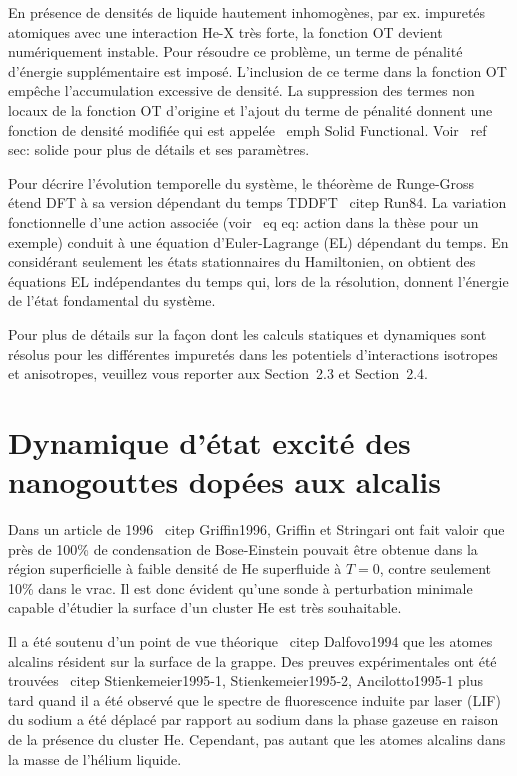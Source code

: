 		En présence de densités de liquide hautement inhomogènes, par ex. impuretés atomiques avec une interaction He-X très forte, la fonction OT devient numériquement instable. Pour résoudre ce problème, un terme de pénalité d'énergie supplémentaire est imposé. L'inclusion de ce terme dans la fonction OT empêche l'accumulation excessive de densité. La suppression des termes non locaux de la fonction OT d'origine et l'ajout du terme de pénalité donnent une fonction de densité modifiée qui est appelée \ emph {Solid Functional}. Voir \ ref {sec: solide} pour plus de détails et ses paramètres.
		
		Pour décrire l'évolution temporelle du système, le théorème de Runge-Gross étend DFT à sa version dépendant du temps TDDFT \ citep {Run84}. La variation fonctionnelle d'une action associée (voir \ eq {eq: action dans la thèse} pour un exemple) conduit à une équation d'Euler-Lagrange (EL) dépendant du temps. En considérant seulement les états stationnaires du Hamiltonien, on obtient des équations EL indépendantes du temps qui, lors de la résolution, donnent l'énergie de l'état fondamental du système.
		
		Pour plus de détails sur la façon dont les calculs statiques et dynamiques sont résolus pour les différentes impuretés dans les potentiels d'interactions isotropes et anisotropes, veuillez vous reporter aux Section~2.3 et Section~2.4.
		
	\section*{Dynamique d'état excité des nanogouttes dopées aux alcalis}
		Dans un article de 1996 \ citep {Griffin1996}, Griffin et Stringari ont fait valoir que près de 100\% de condensation de Bose-Einstein pouvait être obtenue dans la région superficielle à faible densité de He superfluide à $ T = 0 $, contre seulement 10\% dans le vrac. Il est donc évident qu'une sonde à perturbation minimale capable d'étudier la surface d'un cluster He est très souhaitable.
		
		Il a été soutenu d'un point de vue théorique \ citep {Dalfovo1994} que les atomes alcalins résident sur la surface de la grappe. Des preuves expérimentales ont été trouvées \ citep {Stienkemeier1995-1, Stienkemeier1995-2, Ancilotto1995-1} plus tard quand il a été observé que le spectre de fluorescence induite par laser (LIF) du sodium a été déplacé par rapport au sodium dans la phase gazeuse en raison de la présence du cluster He. Cependant, pas autant que les atomes alcalins dans la masse de l'hélium liquide.
		
